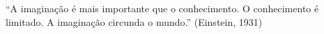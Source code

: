 \begin{epigrafe}
\vspace*{\fill}
\begin{flushright}
\begin{minipage}{0.5\textwidth}
``A imaginação é mais importante que o conhecimento. O conhecimento é limitado. A imaginação circunda o mundo.'' (Einstein, 1931)
\end{minipage}
\end{flushright}
\end{epigrafe}